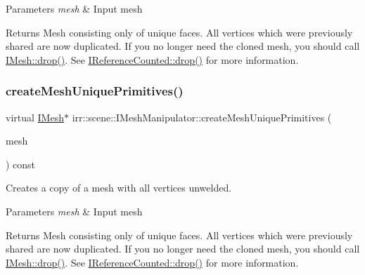 \begin{DoxyParams}{Parameters}
{\em mesh} & Input mesh \\
\hline
\end{DoxyParams}
\begin{DoxyReturn}{Returns}
Mesh consisting only of unique faces. All vertices which were previously shared are now duplicated. If you no longer need the cloned mesh, you should call \hyperlink{classirr_1_1IReferenceCounted_a03856a09355b89d178090c4a5f738543}{I\+Mesh\+::drop()}. See \hyperlink{classirr_1_1IReferenceCounted_a03856a09355b89d178090c4a5f738543}{I\+Reference\+Counted\+::drop()} for more information. 
\end{DoxyReturn}
\mbox{\label{classirr_1_1scene_1_1IMeshManipulator_a73051bc082f128a2e0592fb1a3da2b7d}} 
\subsubsection{\texorpdfstring{create\+Mesh\+Unique\+Primitives()}{createMeshUniquePrimitives()}\hspace{0.1cm}{\footnotesize\ttfamily [2/2]}}
{\footnotesize\ttfamily virtual \hyperlink{classirr_1_1scene_1_1IMesh}{I\+Mesh}$\ast$ irr\+::scene\+::\+I\+Mesh\+Manipulator\+::create\+Mesh\+Unique\+Primitives (\begin{DoxyParamCaption}\item[{\hyperlink{classirr_1_1scene_1_1IMesh}{I\+Mesh} $\ast$}]{mesh }\end{DoxyParamCaption}) const\hspace{0.3cm}{\ttfamily [pure virtual]}}



Creates a copy of a mesh with all vertices unwelded. 


\begin{DoxyParams}{Parameters}
{\em mesh} & Input mesh \\
\hline
\end{DoxyParams}
\begin{DoxyReturn}{Returns}
Mesh consisting only of unique faces. All vertices which were previously shared are now duplicated. If you no longer need the cloned mesh, you should call \hyperlink{classirr_1_1IReferenceCounted_a03856a09355b89d178090c4a5f738543}{I\+Mesh\+::drop()}. See \hyperlink{classirr_1_1IReferenceCounted_a03856a09355b89d178090c4a5f738543}{I\+Reference\+Counted\+::drop()} for more information. 
\end{DoxyReturn}
\mbox{\label{classirr_1_1scene_1_1IMeshManipulator_ac19065037302c0500cb6ebecefcc6c6d}} 
